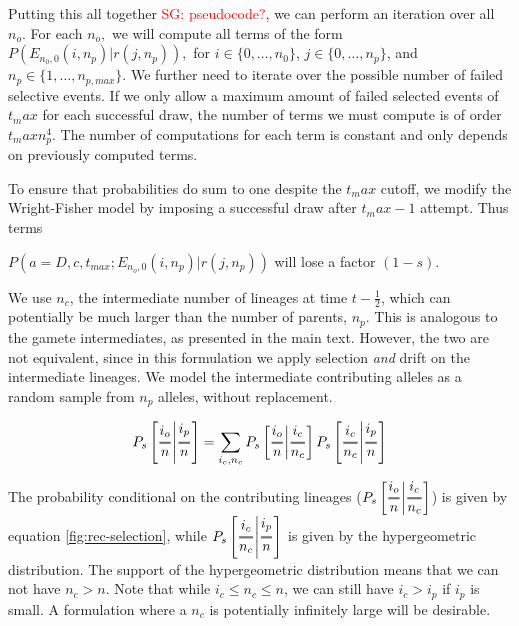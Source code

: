 \documentclass[review]{elsarticle}
\newcommand{\Dfrac}[2]{%
  \ooalign{%
    $\genfrac{}{}{1.2pt}0{#1}{#2}$\cr%
    $\color{white}\genfrac{}{}{.4pt}0{\phantom{#1}}{\phantom{#2}}$}%
}
\newcommand{\cond}{\middle\vert}
\newcommand{\sgcomment}[1]{\textcolor{red}{SG: #1}}
\begin{document}
Putting this all together \sgcomment{pseudocode?}, we can perform an iteration over all $n_o.$ For each $n_o,$  we will compute all terms of the form $P(E_{n_0,0}(i,n_p)  | r(j, n_p)),$ for $i\in\{0,\ldots,n_0\}$, $j\in \{0,\ldots,n_p\}$, and $n_p \in\{1,\ldots,n_{p,max}\}.$ We further need to iterate over the possible number of failed selective events. If we only allow a maximum amount of failed selected events of $t_max$ for each successful draw, the number of terms we must compute is of order $t_max n_p^4$. The number of computations for each term is constant and only depends on previously computed terms. 

To ensure that probabilities do sum to one despite the $t_max$ cutoff, we modify the Wright-Fisher model by imposing a successful draw after $t_max-1$ attempt. Thus terms

$P(a=D,c,t_{max}; E_{n_o,0}(i,n_p)  | r(j, n_p))$ will lose a factor $(1-s)$.   























We use $n_c$, the intermediate number of lineages at time $t-\frac{1}{2}$, which can
potentially be much larger than the number of parents, $n_p$. This is analogous to the gamete
intermediates, as presented in the main text. However, the two are not equivalent, since in this
formulation we apply selection \emph{and} drift on the intermediate lineages. We model the
intermediate contributing alleles as a random sample from $n_p$ alleles, without replacement.

\begin{equation}
  P_s\left[ \Dfrac{i_o}{n} \cond \Dfrac{i_p}{n} \right] = \sum_{i_c,n_c}P_s\left[ \Dfrac{i_o}{n}
    \cond \Dfrac{i_c}{n_c} \right] P_s\left[ \Dfrac{i_c}{n_c} \cond \Dfrac{i_p}{n} \right]
\end{equation}

The probability conditional on the contributing lineages
($P_s\left[ \Dfrac{i_o}{n} \cond \Dfrac{i_c}{n_c} \right]$) is given by equation
\ref{fig:rec-selection}, while $P_s\left[ \Dfrac{i_c}{n_c} \cond \Dfrac{i_p}{n} \right]$ is given by
the hypergeometric distribution. The support of the hypergeometric distribution means that we can
not have $n_c>n$. Note that while $i_c \le n_c \le n$, we can still have $i_c>i_p$ if $i_p$ is
small. A formulation where a $n_c$ is potentially infinitely large will be desirable.
\end{document}
